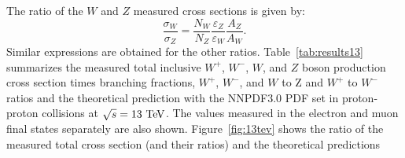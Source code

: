 The ratio of the $W$ and $Z$ measured cross sections is given by:
\begin{equation} \label{eq:xsecr}
\frac{\sigma_W}{\sigma_Z} = \frac{N_W}{N_Z}\frac{\varepsilon_Z}{\varepsilon_W}\frac{A_Z}{A_W}.
\end{equation}
Similar expressions are obtained for the other ratios. Table~\ref{tab:results13} summarizes the measured total inclusive $W^+$, $W^-$, $W$, and $Z$ boson production cross section times branching fractions, $W^+$, $W^-$, and $W$ to Z and $W^+$ to $W^-$ ratios and the theoretical prediction with the NNPDF3.0 PDF set in proton-proton collisions at $\sqrt{s}=13~\mathrm{Te\kern -0.1em V}$. The values measured in the electron and muon final states separately are also shown. Figure~\ref{fig:13tev} shows the ratio of the measured total cross section (and their ratios) and the theoretical predictions 
